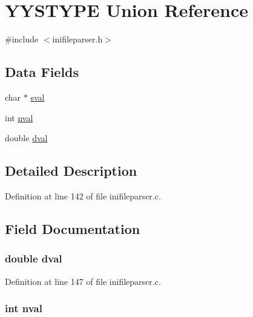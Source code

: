 \hypertarget{union_y_y_s_t_y_p_e}{\section{Y\-Y\-S\-T\-Y\-P\-E Union Reference}
\label{union_y_y_s_t_y_p_e}
}


{\ttfamily \#include $<$inifileparser.\-h$>$}

\subsection*{Data Fields}
\begin{DoxyCompactItemize}
\item 
char $\ast$ \hyperlink{union_y_y_s_t_y_p_e_a461aa6611ed9ae4e07657fc605de5859}{sval}
\item 
int \hyperlink{union_y_y_s_t_y_p_e_ac33cb58153901d74072c46a89fa91e88}{nval}
\item 
double \hyperlink{union_y_y_s_t_y_p_e_acefc0ddbab467d8de90049105846767c}{dval}
\end{DoxyCompactItemize}


\subsection{Detailed Description}


Definition at line 142 of file inifileparser.\-c.



\subsection{Field Documentation}
\hypertarget{union_y_y_s_t_y_p_e_acefc0ddbab467d8de90049105846767c}{
\subsubsection[{dval}]{\setlength{\rightskip}{0pt plus 5cm}double dval}}\label{union_y_y_s_t_y_p_e_acefc0ddbab467d8de90049105846767c}


Definition at line 147 of file inifileparser.\-c.

\hypertarget{union_y_y_s_t_y_p_e_ac33cb58153901d74072c46a89fa91e88}{
\subsubsection[{nval}]{\setlength{\rightskip}{0pt plus 5cm}int nval}}\label{union_y_y_s_t_y_p_e_ac33cb58153901d74072c46a89fa91e88}


